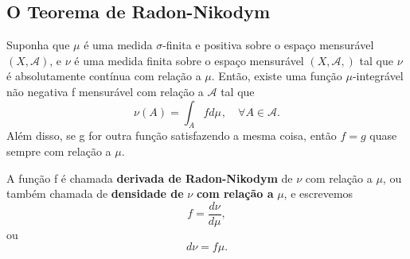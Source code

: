 \documentclass[measure_theory.tex]{subfiles}
\begin{document}
\subsection{O Teorema de Radon-Nikodym}
\hypertarget{radon_nikodym}{
	\begin{theorem*}
		Suponha que \(\mu \) é uma medida \(\sigma \)-finita e positiva sobre o espaço mensurável \((X, \mathcal{A})\), e \(\nu \) é uma medida finita sobre o espaço mensurável \((X, \mathcal{A},)\) tal que \(\nu \) é absolutamente
		contínua com relação a \(\mu \). Então, existe uma função \(\mu \)-integrável não negativa f mensurável com relação a \(\mathcal{A}\) tal que
		\[
			\nu (A) = \int_{A}f d\mu_{},\quad \forall A\in \mathcal{A}.
		\]
		Além disso, se g for outra função satisfazendo a mesma coisa, então \(f = g\) quase sempre com relação a \(\mu \).
	\end{theorem*}}
A função f é chamada \textbf{derivada de Radon-Nikodym} de \(\nu \) com relação a \(\mu \), ou também chamada de \textbf{densidade de }\(\nu \) \textbf{com relação a }\(\mu \), e escrevemos
\[
	f= \frac{d\nu }{d\mu },
\]
ou
\[
	d\nu = f\mu.
\]
\end{document}
